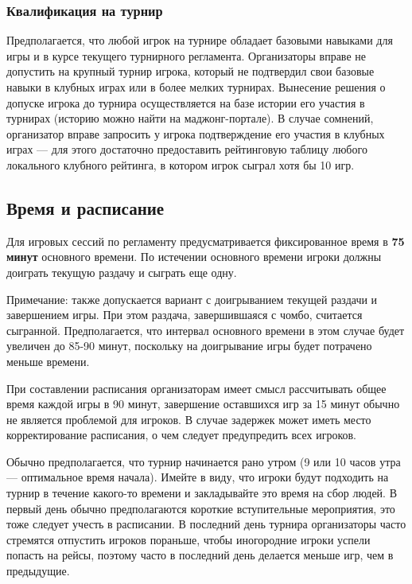 \subsubsection{Квалификация на турнир}

Предполагается, что любой игрок на турнире обладает базовыми навыками для игры и в курсе текущего турнирного регламента. Организаторы вправе не допустить на крупный турнир игрока, который не подтвердил свои базовые навыки в клубных играх или в более мелких турнирах. Вынесение решения о допуске игрока до турнира осуществляется на базе истории его участия в турнирах (историю можно найти на маджонг-портале). В случае сомнений, организатор вправе запросить у игрока подтверждение его участия в клубных играх --- для этого достаточно предоставить рейтинговую таблицу любого локального клубного рейтинга, в котором игрок сыграл хотя бы 10 игр.

\subsection{Время и расписание}

Для игровых сессий по регламенту предусматривается фиксированное время в \textbf{75 минут} основного времени. По истечении основного времени игроки должны доиграть текущую раздачу и сыграть еще одну.

Примечание: также допускается вариант с доигрыванием текущей раздачи и завершением игры. При этом раздача, завершившаяся с чомбо, считается сыгранной. Предполагается, что интервал основного времени в этом случае будет увеличен до 85-90 минут, поскольку на доигрывание игры будет потрачено меньше времени.

При составлении расписания организаторам имеет смысл рассчитывать общее время каждой игры в 90 минут, завершение оставшихся игр за 15 минут обычно не является проблемой для игроков. В случае задержек может иметь место корректирование расписания, о чем следует предупредить всех игроков.

Обычно предполагается, что турнир начинается рано утром (9 или 10 часов утра --- оптимальное время начала). Имейте в виду, что игроки будут подходить на турнир в течение какого-то времени и закладывайте это время на сбор людей. В первый день обычно предполагаются короткие вступительные мероприятия, это тоже следует учесть в расписании. В последний день турнира организаторы часто стремятся отпустить игроков пораньше, чтобы иногородние игроки успели попасть на рейсы, поэтому часто в последний день делается меньше игр, чем в предыдущие.

